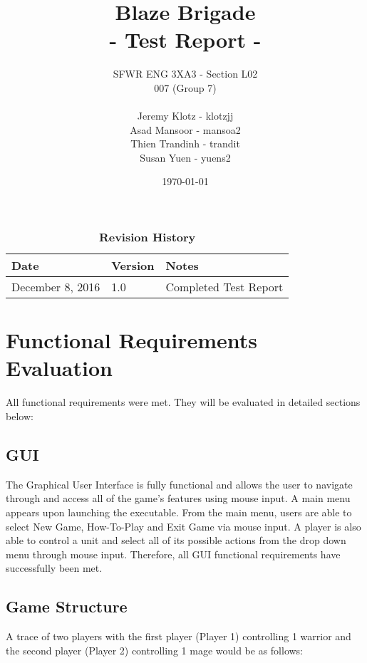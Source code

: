 \documentclass{article}
\title{
    \vspace{40mm}
	\textbf {
	\Huge {\color[rgb]{0.9,0,0}Blaze} Brigade \\
	\large - Test Report -}}
\date{\today}
\author{SFWR ENG 3XA3 - Section L02 \\
	007 (Group 7) \\ \\
	Jeremy Klotz - klotzjj \\
	Asad Mansoor - mansoa2 \\
	Thien Trandinh - trandit \\
	Susan Yuen - yuens2}
\begin{document}
\maketitle
{}
\newpage


\tableofcontents
\listoftables
\listoffigures

\begin{table}[bp]
\caption{\bf Revision History}
\begin{tabularx}{\textwidth}{p{3cm}p{2cm}X}
\toprule {\bf Date} & {\bf Version} & {\bf Notes} \\
\midrule
December 8, 2016 & 1.0 & Completed Test Report \\
\bottomrule
\end{tabularx}
\end{table}

\newpage


\newpage

\section{Functional Requirements Evaluation}

All functional requirements were met. They will be evaluated in detailed sections below:

\subsection{GUI}
The Graphical User Interface is fully functional and allows the user to navigate through and access all of the game's features using mouse input. A main menu appears upon launching the executable. From the main menu, users are able to select New Game, How-To-Play and Exit Game via mouse input. A player is also able to control a unit and select all of its possible actions from the drop down menu through mouse input. Therefore, all GUI functional requirements have successfully been met.

\subsection{Game Structure}
A trace of two players with the first player (Player 1) controlling 1 warrior and the second player (Player 2) controlling 1 mage would be as follows: \\
\end{document}
